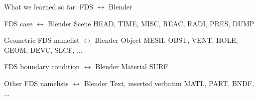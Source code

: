 \documentclass[aspectratio=169]{beamer}
\begin{document}
\begin{frame}[fragile]{What we learned so far: \linebreak FDS $\leftrightarrow$ Blender}
    \begin{vfilleditems}
        \item FDS case $\leftrightarrow$ Blender Scene
        {\small \linebreak HEAD, TIME, MISC, REAC, RADI, PRES, DUMP}
        \item Geometric FDS namelist $\leftrightarrow$ Blender Object
        {\small \linebreak MESH, OBST, VENT, HOLE, GEOM, DEVC, SLCF, ...}
        \item FDS boundary condition $\leftrightarrow$ Blender Material
        {\small \linebreak SURF}
        \item  Other FDS namelists $\leftrightarrow$ Blender Text, inserted verbatim
        {\small \linebreak MATL, PART, BNDF, ...}
    \end{vfilleditems}
\end{frame}
\end{document}
